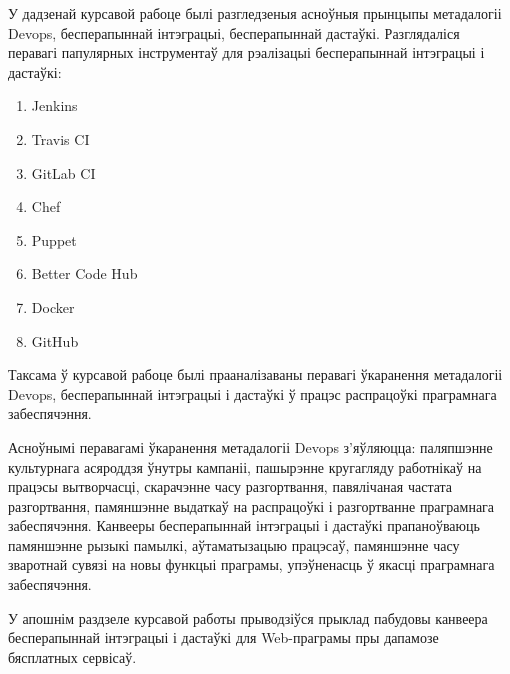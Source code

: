 
У дадзенай курсавой рабоце былі разгледзеныя асноўныя
прынцыпы метадалогіі Devops, бесперапыннай інтэграцыі,
бесперапыннай дастаўкі.
Разглядаліся перавагі папулярных інструментаў для рэалізацыі бесперапыннай
інтэграцыі і дастаўкі:
\begin{enumerate}
    \item Jenkins
    \item Travis CI
    \item GitLab CI
    \item Chef
    \item Puppet
    \item Better Code Hub
    \item Docker
    \item GitHub
\end{enumerate}

Таксама ў курсавой рабоце былі прааналізаваны перавагі ўкаранення
метадалогіі Devops, бесперапыннай інтэграцыі і дастаўкі ў працэс
распрацоўкі праграмнага забеспячэння.

Асноўнымі перавагамі ўкаранення метадалогіі Devops з'яўляюцца:
паляпшэнне культурнага асяроддзя ўнутры кампаніі,
пашырэнне кругагляду работнікаў на працэсы вытворчасці,
скарачэнне часу разгортвання,
павялічаная частата разгортвання,
памяншэнне выдаткаў на распрацоўкі і разгортванне праграмнага забеспячэння.
Канвееры бесперапыннай інтэграцыі і дастаўкі
прапаноўваюць памяншэнне рызыкі памылкі,
аўтаматызацыю працэсаў,
памяншэнне часу зваротнай сувязі на новы функцыі праграмы,
упэўненасць ў якасці праграмнага забеспячэння.

У апошнім раздзеле курсавой работы прыводзіўся прыклад пабудовы
канвеера бесперапыннай інтэграцыі і дастаўкі для Web-праграмы
пры дапамозе бясплатных сервісаў.
